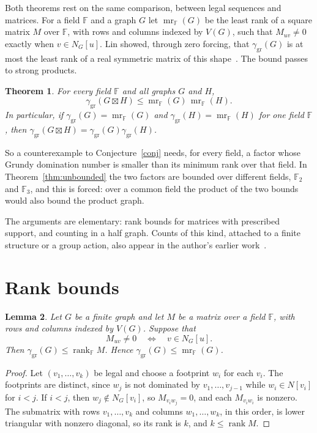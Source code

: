 \documentclass[11pt,a4paper,reqno]{amsart}
\newtheorem{theorem}{Theorem}[section]
\newtheorem{lemma}[theorem]{Lemma}
\theoremstyle{definition}
\theoremstyle{remark}
\numberwithin{equation}{section}
\newcommand{\ggr}{\gamma_{\mathrm{gr}}}
\newcommand{\sprod}{\boxtimes}
\newcommand{\F}{\mathbb{F}}
\begin{document}
Both theorems rest on the same comparison, between legal sequences and matrices. For a field $\F$ and a graph $G$ let $\operatorname{mr}_\F(G)$ be the least rank of a square matrix $M$ over $\F$, with rows and columns indexed by $V(G)$, such that $M_{uv}\ne0$ exactly when $v\in N_G[u]$. Lin showed, through zero forcing, that $\ggr(G)$ is at most the least rank of a real symmetric matrix of this shape~\cite[Theorem~3.1]{Lin19}. The bound passes to strong products.

\begin{theorem}\label{thm:rank}
For every field $\F$ and all graphs $G$ and $H$,
\[
 \ggr(G\sprod H)\le\operatorname{mr}_\F(G)\,\operatorname{mr}_\F(H).
\]
In particular, if $\ggr(G)=\operatorname{mr}_\F(G)$ and $\ggr(H)=\operatorname{mr}_\F(H)$ for one field $\F$, then $\ggr(G\sprod H)=\ggr(G)\ggr(H)$.
\end{theorem}

So a counterexample to Conjecture~\ref{conj} needs, for every field, a factor whose Grundy domination number is smaller than its minimum rank over that field. In Theorem~\ref{thm:unbounded} the two factors are bounded over different fields, $\F_2$ and $\F_3$, and this is forced: over a common field the product of the two bounds would also bound the product graph.

The arguments are elementary: rank bounds for matrices with prescribed support, and counting in a half graph. Counts of this kind, attached to a finite structure or a group action, also appear in the author's earlier work~\cite{Bha22a,Bha22b,BB26}.

\section{Rank bounds}\label{sec:rank}

\begin{lemma}\label{lem:rank}
Let $G$ be a finite graph and let $M$ be a matrix over a field $\F$, with rows and columns indexed by $V(G)$. Suppose that
\[
 M_{uv}\ne0\quad\Longleftrightarrow\quad v\in N_G[u].
\]
Then $\ggr(G)\le\operatorname{rank}_{\F}M$. Hence $\ggr(G)\le\operatorname{mr}_\F(G)$.
\end{lemma}

\begin{proof}
Let $(v_1,\dots,v_k)$ be legal and choose a footprint $w_i$ for each $v_i$. The footprints are distinct, since $w_j$ is not dominated by $v_1,\dots,v_{j-1}$ while $w_i\in N[v_i]$ for $i<j$. If $i<j$, then $w_j\notin N_G[v_i]$, so $M_{v_iw_j}=0$, and each $M_{v_iw_i}$ is nonzero. The submatrix with rows $v_1,\dots,v_k$ and columns $w_1,\dots,w_k$, in this order, is lower triangular with nonzero diagonal, so its rank is $k$, and $k\le\operatorname{rank}M$.
\end{proof}
\end{document}

